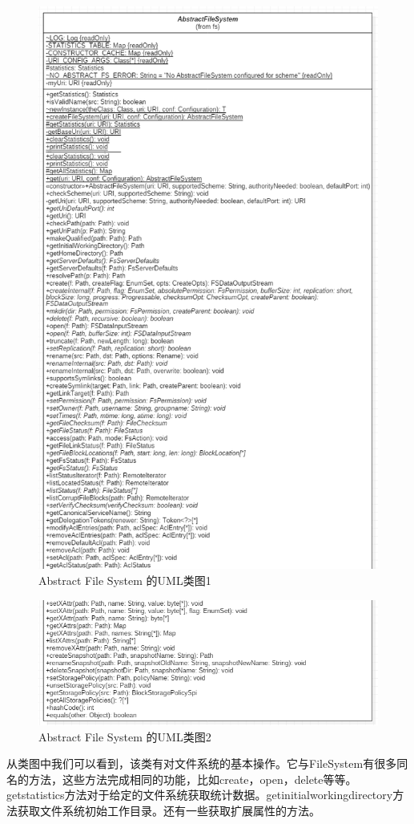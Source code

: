 \begin{figure}
\centering
\includegraphics[width=1\linewidth]{UML/abstractfilesystem/abstractFileSystem1.PNG}
\caption{Abstract File System 的UML类图1}
\label{fig:abstractFileSystem1}
\end{figure}

\begin{figure}
\centering
\includegraphics[width=1\linewidth]{UML/abstractfilesystem/abstractFileSystem2.PNG}
\caption{Abstract File System 的UML类图2}
\label{fig:abstractFileSystem2}
\end{figure}
从类图中我们可以看到，该类有对文件系统的基本操作。它与FileSystem有很多同名的方法，这些方法完成相同的功能，比如create，open，delete等等。getstatistics方法对于给定的文件系统获取统计数据。getinitialworkingdirectory方法获取文件系统初始工作目录。还有一些获取扩展属性的方法。

